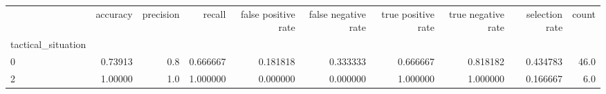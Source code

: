 \begin{tabular}{lrrrrrrrrr}
\toprule
{} &  accuracy &  precision &    recall &  false positive rate &  false negative rate &  true positive rate &  true negative rate &  selection rate &  count \\
tactical\_situation &           &            &           &                      &                      &                     &                     &                 &        \\
\midrule
0                  &   0.73913 &        0.8 &  0.666667 &             0.181818 &             0.333333 &            0.666667 &            0.818182 &        0.434783 &   46.0 \\
2                  &   1.00000 &        1.0 &  1.000000 &             0.000000 &             0.000000 &            1.000000 &            1.000000 &        0.166667 &    6.0 \\
\bottomrule
\end{tabular}

